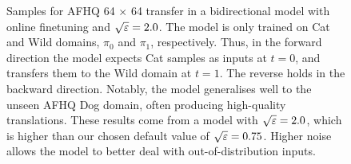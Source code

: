 \documentclass{article}
\begin{document}
\begin{figure}[htbp]
    \hfill
    \caption{Samples for AFHQ 64 $\times$ 64 transfer in a bidirectional model with online finetuning and $\sqrt {\varepsilon}=2.0$. The model is only trained on Cat and Wild domains, $\pi_0$ and $\pi_1$, respectively. Thus, in the forward direction the model expects Cat samples as inputs at $t=0$, and transfers them to the Wild domain at $t=1$. The reverse holds in the backward direction.
    Notably, the model generalises well to the unseen AFHQ Dog domain, often producing high-quality translations. These results come from a model with $\sqrt{\varepsilon} = 2.0$, which is higher than our chosen default value of $\sqrt{\varepsilon} = 0.75$. Higher noise allows the model to better deal with out-of-distribution inputs.      
    } 
    \label{fig:afhq64_dogs} 
\end{figure}
\end{document}
